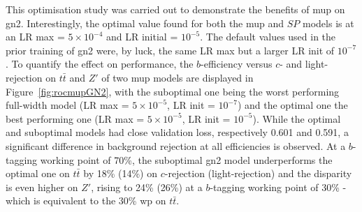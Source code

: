 This optimisation study was carried out to demonstrate the benefits of \gls{mup} on \gls{gn2}. Interestingly, the optimal value found for both the \gls{mup} and $SP$ models is at an LR max = $5 \times 10^{-4}$ and LR initial = $10^{-5}$. The default values used in the prior training of \gls{gn2} were, by luck, the same LR max but a larger LR init of $10^{-7}$. To quantify the effect on performance, the $b$-efficiency versus $c$- and light-rejection on $t\bar{t}$ and $Z'$ of two \gls{mup} models are displayed in Figure~\ref{fig:rocmupGN2}, with the suboptimal one being the worst performing full-width model (LR max = $5 \times 10^{-5}$, LR init = $10^{-7}$) and the optimal one the best performing one (LR max = $5\times 10^{-5}$, LR init = $10^{-5}$). While the optimal and suboptimal models had close validation loss, respectively 0.601 and 0.591, a significant difference in background rejection at all efficiencies is observed. At a $b$-tagging working point of 70\%, the suboptimal \gls{gn2} model underperforms the optimal one on $t\bar{t}$ by 18\% (14\%) on $c$-rejection (light-rejection) and the disparity is even higher on $Z'$, rising to 24\% (26\%) at a $b$-tagging working point of 30\% - which is equivalent to the 30\% \gls{wp} on $t\bar{t}$.

